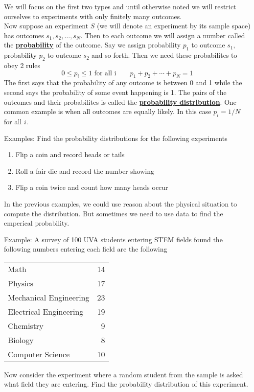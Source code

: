 \documentclass[14,fleqn]{article}
\newcommand{\defn}[1]{\textbf{\underline{#1}}}
\begin{document}
We will focus on the first two types and until otherwise noted we will restrict ourselves to experiments with only finitely many outcomes.\\

Now suppose an experiment $S$ (we will denote an experiment by its sample space) has outcomes $s_1,s_2,\dots,s_N.$ Then to each outcome we will assign a number called the \defn{probability} of the outcome. Say we assign probability $p_1$ to outcome $s_1,$ probability $p_2$ to outcome $s_2$ and so forth. Then we need these probabilites to obey 2 rules
\[
	0\le p_i\le 1 \text{ for all i}\qquad p_1+p_2+\cdots +p_N=1
\]
The first says that the probability of any outcome is between 0 and 1 while the second says the probability of some event happening is 1. The pairs of the outcomes and their probabilites is called the \defn{probability distribution}. One common example is when all outcomes are equally likely. In this case $p_i=1/N$ for all $i.$

Examples: Find the probability distributions for the following experiments\\
\begin{enumerate}
	\item Flip a coin and record heads or tails
	\item Roll a fair die and record the number showing
	\item Flip a coin twice and count how many heads occur
\end{enumerate}

In the previous examples, we could use reason about the physical situation to compute the distribution. But sometimes we need to use data to find the emperical probability.

Example: A survey of 100 UVA students entering STEM fields found the following numbers entering each field are the following\\
\begin{tabular}{lr}
	Math&14\\
	Physics&17\\
	Mechanical Engineering&23\\
	Electrical Engineering&19\\
	Chemistry&9\\
	Biology&8\\
	Computer Science&10\\
\end{tabular}
Now consider the experiment where a random student from the sample is asked what field they are entering. Find the probability distribution of this experiment.\\
\end{document}
